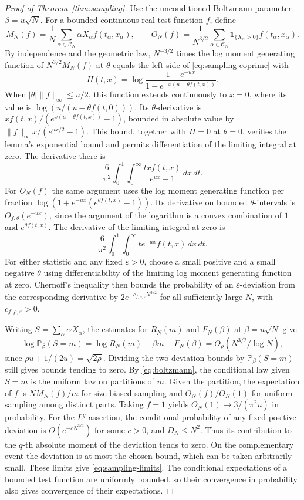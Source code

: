 \documentclass[11pt]{amsart}
\theoremstyle{remark}
\begin{document}
\begin{proof}[Proof of Theorem~\ref{thm:sampling}]
Use the unconditioned Boltzmann parameter \(\beta=u\sqrt N\). For a bounded
continuous real test function \(f\), define
\[
 M_N(f)=\frac{1}{N}\sum_{\alpha\in\mathcal C_N}
           \alpha X_\alpha f(t_\alpha,x_\alpha),\qquad
 O_N(f)=\frac{1}{N^{3/2}}\sum_{\alpha\in\mathcal C_N}
           \mathbf 1_{\{X_\alpha>0\}} f(t_\alpha,x_\alpha).
\]
By independence and the geometric law, \(N^{-3/2}\) times the log moment
generating function of \(N^{3/2}M_N(f)\) at \(\theta\) equals the left side
of \eqref{eq:sampling-coprime} with
\[
 H(t,x)=\log\frac{1-e^{-ux}}{1-e^{-x(u-\theta f(t,x))}}.
\]
When \(|\theta|\|f\|_\infty\le u/2\), this function extends continuously to
\(x=0\), where its value is \(\log(u/(u-\theta f(t,0)))\). Its
\(\theta\)-derivative is \(x f(t,x)/(e^{x(u-\theta f(t,x))}-1)\), bounded
in absolute value by \(\|f\|_\infty x/(e^{ux/2}-1)\). This bound, together
with \(H=0\) at \(\theta=0\), verifies the lemma's exponential bound and
permits differentiation of the limiting integral at zero. The derivative
there is
\[
 \frac{6}{\pi^2}\int_0^1\int_0^\infty
      \frac{tx f(t,x)}{e^{ux}-1}\,dx\,dt.
\]
For \(O_N(f)\) the same argument uses the log moment generating function
per fraction \(\log(1+e^{-ux}(e^{\theta f(t,x)}-1))\). Its derivative on
bounded \(\theta\)-intervals is \(O_{f,\theta}(e^{-ux})\), since the argument
of the logarithm is a convex combination of \(1\) and \(e^{\theta f(t,x)}\).
The derivative of the limiting integral at zero is
\[
 \frac{6}{\pi^2}\int_0^1\int_0^\infty t e^{-ux}f(t,x)\,dx\,dt.
\]
For either statistic and any fixed \(\varepsilon>0\), choose a small positive
and a small negative \(\theta\) using differentiability of the limiting log
moment generating function at zero. Chernoff's inequality then bounds the
probability of an \(\varepsilon\)-deviation from the corresponding derivative
by \(2e^{-c_{f,\rho,\varepsilon} N^{3/2}}\) for all sufficiently large
\(N\), with \(c_{f,\rho,\varepsilon}>0\).

Writing \(S=\sum_\alpha\alpha X_\alpha\), the estimates for \(R_N(m)\) and
\(F_N(\beta)\) at \(\beta=u\sqrt N\) give
\[
 \log\mathbb P_\beta(S=m)=\log R_N(m)-\beta m-F_N(\beta)
      =O_\rho(N^{3/2}/\log N),
\]
since \(\rho u+1/(2u)=\sqrt{2\rho}\). Dividing the two deviation bounds by
\(\mathbb P_\beta(S=m)\) still gives bounds tending to zero. By
\eqref{eq:boltzmann}, the conditional law given \(S=m\) is the uniform
law on partitions of \(m\). Given the partition, the expectation of \(f\)
is \(NM_N(f)/m\) for size-biased sampling and \(O_N(f)/O_N(1)\) for
uniform sampling among distinct parts. Taking \(f=1\) yields
\(O_N(1)\to 3/(\pi^2u)\) in probability. For the \(L^q\) assertion, the
conditional probability of any fixed positive deviation is
\(O(e^{-cN^{3/2}})\) for some \(c>0\), and \(D_N\le N^2\). Thus its
contribution to the \(q\)-th absolute moment of the deviation tends to
zero. On the complementary event the deviation is at most the chosen
bound, which can be taken arbitrarily small. These limits give
\eqref{eq:sampling-limits}. The conditional expectations of a bounded
test function are uniformly bounded, so their convergence in probability
also gives convergence of their expectations.
\end{proof}
\end{document}
